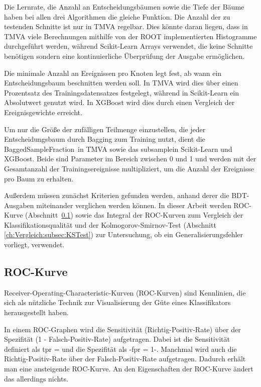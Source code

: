 Die Lernrate, die Anzahl an Entscheidungsb\"aumen sowie die Tiefe der B\"aume haben bei allen drei Algorithmen die gleiche Funktion. Die Anzahl der zu testenden Schnitte ist nur in TMVA regelbar. Dies k\"onnte daran liegen, dass in TMVA viele Berechnungen mithilfe von der ROOT implementierten Histogramme durchgef\"uhrt werden, w\"ahrend Scikit-Learn Arrays verwendet, die keine Schnitte ben\"otigen sondern eine kontinuierliche \"Uberpr\"ufung der Ausgabe erm\"oglichen. 

Die minimale Anzahl an Ereignissen pro Knoten legt fest, ab wann ein Entscheidungsbaum beschnitten werden soll. In TMVA wird dies \"uber einen Prozentsatz des Trainingsdatensatzes festgelegt, w\"ahrend in Scikit-Learn ein Absolutwert genutzt wird. In XGBoost wird dies durch einen Vergleich der Ereignisgewichte erreicht.

Um nur die Gr\"o\ss e der zuf\"alligen Teilmenge einzustellen, die jeder Entscheidungsbaum durch Bagging zum Training nutzt, dient die \glqq BaggedSampleFraction\grqq~in TMVA sowie das \glqq subsample\grqq in Scikit-Learn und XGBoost. Beide sind Parameter im Bereich zwischen 0 und 1 und werden mit der Gesamtanzahl der Trainingsereignisse multipliziert, um die Anzahl der Ereignisse pro Baum zu erhalten.

Au\ss erdem m\"ussen zun\"achst Kriterien gefunden werden, anhand derer die BDT-Ausgaben miteinander verglichen werden k\"onnen. In dieser Arbeit werden ROC-Kurve (Abschnitt~\ref{ch:Vergleich:subsec:ROC}) sowie das Integral der ROC-Kurven zum Vergleich der Klassifikationsqualit\"at und der Kolmogorov-Smirnov-Test (Abschnitt \ref{ch:Vergleich:subsec:KSTest}) zur Untersuchung, ob ein Generalisierungsfehler vorliegt, verwendet.

\subsection{ROC-Kurve}
\label{ch:Vergleich:subsec:ROC}

Receiver-Operating-Characteristic-Kurven (ROC-Kurven) sind Kennlinien, die sich als n\"utzliche Technik zur Visualisierung der G\"ute eines Klassifikators herausgestellt haben.

In einem ROC-Graphen wird die Sensitivit\"at (Richtig-Positiv-Rate) \"uber der Spezifit\"at (1 - Falsch-Positiv-Rate) aufgetragen. Dabei ist die Sensitivit\"at definiert als
\beq
tpr = 
\label{eq:TPR}
\eeq
und die Spezifit\"at als
-fpr = 1-.
\label{eq:1-FPR}
\eeq
%
Manchmal wird auch die Richtig-Positiv-Rate \"uber der Falsch-Positiv-Rate aufgetragen. Dadurch erh\"alt man eine ansteigende ROC-Kurve. An den Eigenschaften der ROC-Kurve \"andert das allerdings nichts.

